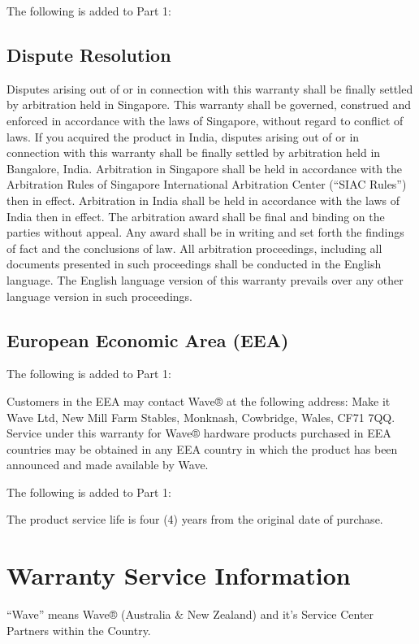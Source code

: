 \documentclass[letterpaper,10pt,openany,oneside,english]{sphinxmanual}
\begin{document}

The following is added to Part 1:


\subsection{Dispute Resolution}
\label{\detokenize{part2:dispute-resolution}}
Disputes arising out of or in connection with this warranty shall be finally settled by arbitration held in Singapore. This warranty shall be governed, construed and enforced in accordance with the laws of Singapore, without regard to conflict of laws. If you acquired the product in India, disputes arising out of or in connection with this warranty shall be finally settled by arbitration held in Bangalore, India. Arbitration in Singapore shall be held in accordance with the Arbitration Rules of Singapore International Arbitration Center (“SIAC Rules”) then in effect. Arbitration in India shall be held in accordance with the laws of India then in effect. The arbitration award shall be final and binding on the parties without appeal. Any award shall be in writing and set forth the findings of fact and the conclusions of law. All arbitration proceedings, including all documents presented in such proceedings shall be conducted in the English language. The English language version of this warranty prevails over any other language version in such proceedings.


\subsection{European Economic Area (EEA)}
\label{\detokenize{part2:european-economic-area-eea}}
The following is added to Part 1:

Customers in the EEA may contact Wave® at the following address: Make it Wave Ltd, New Mill Farm Stables, Monknash, Cowbridge, Wales, CF71 7QQ. Service under this warranty for Wave® hardware products purchased in EEA countries may be obtained in any EEA country in which the product has been announced and made available by Wave.


The following is added to Part 1:

The product service life is four (4) years from the original date of purchase.


\section{Warranty Service Information}
\label{\detokenize{part3:warranty-service-information}}\label{\detokenize{part3::doc}}
“Wave” means Wave® (Australia \& New Zealand) and it’s Service Center Partners within the Country.
\end{document}
